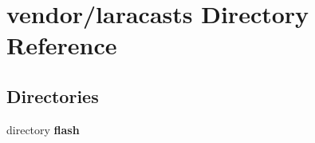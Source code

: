 \section{vendor/laracasts Directory Reference}
\label{dir_1db9f7b998470798f78beb01a20ce0f2}
\subsection*{Directories}
\begin{DoxyCompactItemize}
\item 
directory {\bf flash}
\end{DoxyCompactItemize}
